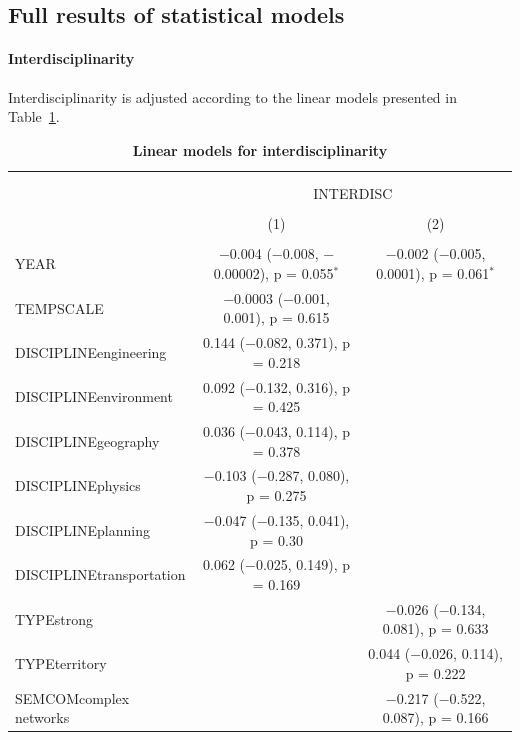 \documentclass[10pt]{article}
\begin{document}
\subsection*{Full results of statistical models}

\paragraph{Interdisciplinarity}

Interdisciplinarity is adjusted according to the linear models presented in Table~\ref{tab:app:modelography:interdisc}.


\begin{table}%
\centering 
  \caption{\textbf{Linear models for interdisciplinarity}\label{tab:app:modelography:interdisc}}
\begin{tabular}{@{\extracolsep{5pt}}lcc} 
\footnotesize
\\[-1.8ex]\hline 
\hline \\[-1.8ex] 
\\[-1.8ex] & \multicolumn{2}{c}{INTERDISC} \\ 
\\[-1.8ex] & (1) & (2)\\ 
\hline \\[-1.8ex] 
 YEAR & $-$0.004 ($-$0.008, $-$0.00002), p = 0.055$^{*}$ & $-$0.002 ($-$0.005, 0.0001), p = 0.061$^{*}$ \\ 
  TEMPSCALE & $-$0.0003 ($-$0.001, 0.001), p = 0.615 &  \\ 
  DISCIPLINEengineering & 0.144 ($-$0.082, 0.371), p = 0.218 &  \\ 
  DISCIPLINEenvironment & 0.092 ($-$0.132, 0.316), p = 0.425 &  \\ 
  DISCIPLINEgeography & 0.036 ($-$0.043, 0.114), p = 0.378 &  \\ 
  DISCIPLINEphysics & $-$0.103 ($-$0.287, 0.080), p = 0.275 &  \\ 
  DISCIPLINEplanning & $-$0.047 ($-$0.135, 0.041), p = 0.30 &  \\ 
  DISCIPLINEtransportation & 0.062 ($-$0.025, 0.149), p = 0.169 &  \\ 
  TYPEstrong &  & $-$0.026 ($-$0.134, 0.081), p = 0.633 \\ 
  TYPEterritory &  & 0.044 ($-$0.026, 0.114), p = 0.222 \\ 
  SEMCOMcomplex networks &  & $-$0.217 ($-$0.522, 0.087), p = 0.166 \\ 

\end{tabular}
\end{table}
\end{document}
